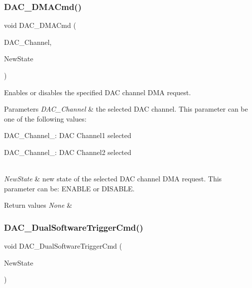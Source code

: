 \subsubsection{\texorpdfstring{DAC\_DMACmd()}{DAC\_DMACmd()}}
{\footnotesize\ttfamily void D\+A\+C\+\_\+\+D\+M\+A\+Cmd (\begin{DoxyParamCaption}\item[{uint32\+\_\+t}]{D\+A\+C\+\_\+\+Channel,  }\item[{\mbox{\hyperlink{group___exported__types_gac9a7e9a35d2513ec15c3b537aaa4fba1}{Functional\+State}}}]{New\+State }\end{DoxyParamCaption})}



Enables or disables the specified D\+AC channel D\+MA request. 


\begin{DoxyParams}{Parameters}
{\em D\+A\+C\+\_\+\+Channel} & the selected D\+AC channel. This parameter can be one of the following values\+: \begin{DoxyItemize}
\item D\+A\+C\+\_\+\+Channel\+\_\+: D\+AC Channel1 selected \item D\+A\+C\+\_\+\+Channel\+\_\+: D\+AC Channel2 selected \end{DoxyItemize}
\\
\hline
{\em New\+State} & new state of the selected D\+AC channel D\+MA request. This parameter can be\+: E\+N\+A\+B\+LE or D\+I\+S\+A\+B\+LE. \\
\hline
\end{DoxyParams}

\begin{DoxyRetVals}{Return values}
{\em None} & \\
\hline
\end{DoxyRetVals}
\mbox{\label{group___d_a_c___private___functions_gab4d3b364a6b184dcd65f3b294ebf56dc}} 
\subsubsection{\texorpdfstring{DAC\_DualSoftwareTriggerCmd()}{DAC\_DualSoftwareTriggerCmd()}}
{\footnotesize\ttfamily void D\+A\+C\+\_\+\+Dual\+Software\+Trigger\+Cmd (\begin{DoxyParamCaption}\item[{\mbox{\hyperlink{group___exported__types_gac9a7e9a35d2513ec15c3b537aaa4fba1}{Functional\+State}}}]{New\+State }\end{DoxyParamCaption})}



